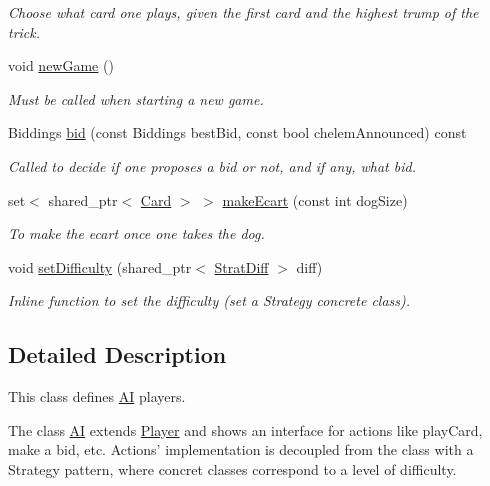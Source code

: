 \begin{DoxyCompactItemize}
\begin{DoxyCompactList}\small\item\em \-Choose what card one plays, given the first card and the highest trump of the trick. \end{DoxyCompactList}\item 
void \hyperlink{classAI_a6cda26d3bf7238b1a7ea3725bf4aabb7}{new\-Game} ()
\begin{DoxyCompactList}\small\item\em \-Must be called when starting a new game. \end{DoxyCompactList}\item 
\-Biddings \hyperlink{classAI_a9e2fd7ff440ada8339135c23b73e1a96}{bid} (const \-Biddings best\-Bid, const bool chelem\-Announced) const 
\begin{DoxyCompactList}\small\item\em \-Called to decide if one proposes a bid or not, and if any, what bid. \end{DoxyCompactList}\item 
set$<$ shared\-\_\-ptr$<$ \hyperlink{classCard}{\-Card} $>$ $>$ \hyperlink{classAI_ad12a3efd1da4acc6e1855bd7262779e3}{make\-Ecart} (const int dog\-Size)
\begin{DoxyCompactList}\small\item\em \-To make the ecart once one takes the dog. \end{DoxyCompactList}\item 
void \hyperlink{classAI_a19cae044bb7f221819f61b017b6a7ffe}{set\-Difficulty} (shared\-\_\-ptr$<$ \hyperlink{classStratDiff}{\-Strat\-Diff} $>$ diff)
\begin{DoxyCompactList}\small\item\em \-Inline function to set the difficulty (set a \-Strategy concrete class). \end{DoxyCompactList}\end{DoxyCompactItemize}


\subsection{\-Detailed \-Description}
\-This class defines \hyperlink{classAI}{\-A\-I} players. 

\-The class \hyperlink{classAI}{\-A\-I} extends \hyperlink{classPlayer}{\-Player} and shows an interface for actions like play\-Card, make a bid, etc. \-Actions' implementation is decoupled from the class with a \-Strategy pattern, where concret classes correspond to a level of difficulty. 

